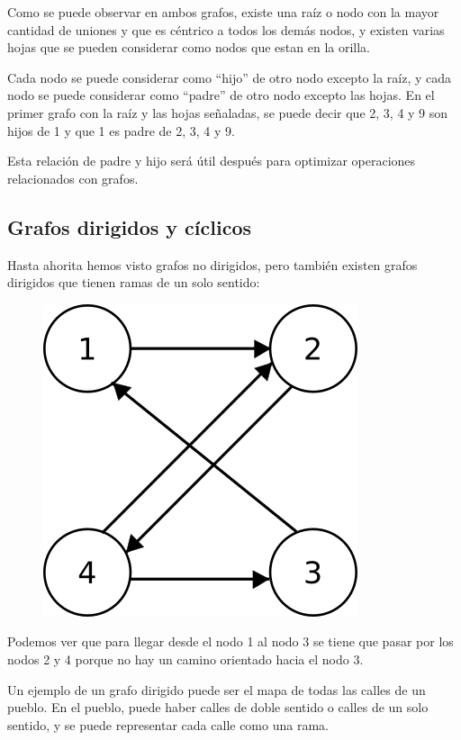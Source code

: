 \documentclass{article}
\begin{document}
Como se puede observar en ambos grafos, existe una raíz o nodo con la mayor cantidad de uniones y que es céntrico a todos los demás nodos, y existen varias hojas que se pueden considerar como nodos que estan en la orilla.

Cada nodo se puede considerar como ``hijo'' de otro nodo excepto la raíz, y cada nodo se puede considerar como ``padre'' de otro nodo excepto las hojas. En el primer grafo con la raíz y las hojas señaladas, se puede decir que 2, 3, 4 y 9 son hijos de 1 y que 1 es padre de 2, 3, 4 y 9.

Esta relación de padre y hijo será útil después para optimizar operaciones relacionados con grafos.

\subsection{Grafos dirigidos y cíclicos}

Hasta ahorita hemos visto grafos no dirigidos, pero también existen grafos dirigidos que tienen ramas de un solo sentido:

\begin{figure}[H]
    \centering
    \includegraphics[width=0.15\paperwidth]{dirigido}
\end{figure}

Podemos ver que para llegar desde el nodo 1 al nodo 3 se tiene que pasar por los nodos 2 y 4 porque no hay un camino orientado hacia el nodo 3.

Un ejemplo de un grafo dirigido puede ser el mapa de todas las calles de un pueblo. En el pueblo, puede haber calles de doble sentido o calles de un solo sentido, y se puede representar cada calle como una rama.
\end{document}
